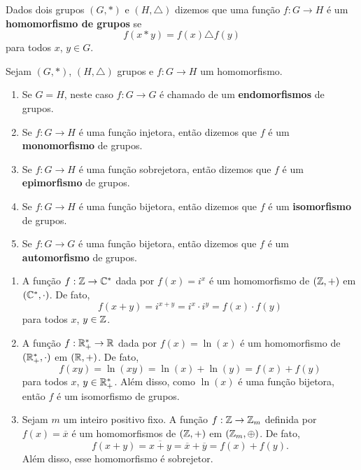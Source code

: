 \begin{definicao}
    Dados dois grupos $(G, *)$ e $(H,\triangle)$ dizemos que uma função $f : G \to H$ é um \textbf{homomorfismo de grupos} se
    \[
        f(x * y) = f(x)\triangle f(y)
    \]
    para todos $x$, $y \in G$.
\end{definicao}

\begin{observacao}
    Sejam $(G, *)$, $(H, \triangle)$ grupos e $f : G \to H$ um homomorfismo.
    \begin{enumerate}[label={\arabic*})]
        \item Se $G = H$, neste caso $f : G \to G$ é chamado de um \textbf{endomorfismos} de grupos.
        \item Se $f : G \to H$ é uma função injetora, então dizemos que $f$ é um \textbf{monomorfismo} de grupos.
        \item Se $f : G \to H$ é uma função sobrejetora, então dizemos que $f$ é um \textbf{epimorfismo} de grupos.
        \item Se $f : G \to H$ é uma função bijetora, então dizemos que $f$ é um \textbf{isomorfismo} de grupos.
        \item Se $f : G \to G$ é uma função bijetora, então dizemos que $f$ é um \textbf{automorfismo} de grupos.
    \end{enumerate}
\end{observacao}

\begin{exemplos}
    \begin{enumerate}[label={\arabic*})]
        \item A função $f : \mathbb{Z} \to \mathbb{C}^*$ dada por $f(x) = i^x$ é um homomorfismo de $(\mathbb{Z}, +)$ em $(\mathbb{C}^*, \cdot)$. De fato,
        \[
            f(x + y) = i^{x + y} = i^x\cdot i^y = f(x)\cdot f(y)
        \]
        para todos $x$, $y \in \mathbb{Z}$.

        \item A função $f : \mathbb{R}^*_+ \to \mathbb{R}$ dada por $f(x) = \ln(x)$ é um homomorfismo de $(\mathbb{R}^*_+, \cdot)$ em $(\mathbb{R}, +)$. De fato,
        \[
            f(xy) = \ln(xy) = \ln(x) + \ln(y) = f(x) + f(y)
        \]
        para todos $x$, $y \in \mathbb{R}^*_+$. Além disso, como $\ln(x)$ é uma função bijetora, então $f$ é um isomorfismo de grupos.

        \item Sejam $m$ um inteiro positivo fixo. A função $f: \mathbb{Z} \to \mathbb{Z}_m$ definida por $f(x) = \overline{x}$ é um homomorfismos de $(\mathbb{Z}, +)$ em $(\mathbb{Z}_m, \oplus)$. De fato,
        \[
            f(x + y) = \overline{x + y} = \overline{x} + \overline{y} = f(x) + f(y).
        \]
        Além disso, esse homomorfismo é sobrejetor.
    \end{enumerate}
\end{exemplos}

